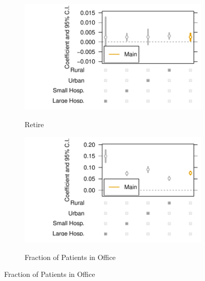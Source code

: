 \documentclass[12pt]{article}
\begin{document}
\begin{figure}[t!]
\begin{subfigure}{0.48\textwidth}
\caption{Retire}
\includegraphics[width=\linewidth]{Objects/retire_heterog.pdf}
\label{fig:a}
\end{subfigure}\hspace*{\fill}
\begin{subfigure}{0.48\textwidth}
\caption{Fraction of Patients in Office}
\includegraphics[width=\linewidth]{Objects/office_frac_heterog.pdf}
\label{fig:b}
\end{subfigure}


\end{figure}
\end{document}
